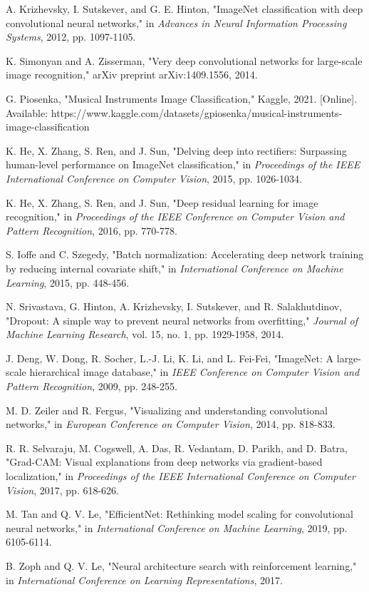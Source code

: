 \begin{thebibliography}{00}
 A. Krizhevsky, I. Sutskever, and G. E. Hinton, "ImageNet classification with deep convolutional neural networks," in \textit{Advances in Neural Information Processing Systems}, 2012, pp. 1097-1105.

 K. Simonyan and A. Zisserman, "Very deep convolutional networks for large-scale image recognition," arXiv preprint arXiv:1409.1556, 2014.

 G. Piosenka, "Musical Instruments Image Classification," Kaggle, 2021. [Online]. Available: https://www.kaggle.com/datasets/gpiosenka/musical-instruments-image-classification

 K. He, X. Zhang, S. Ren, and J. Sun, "Delving deep into rectifiers: Surpassing human-level performance on ImageNet classification," in \textit{Proceedings of the IEEE International Conference on Computer Vision}, 2015, pp. 1026-1034.

 K. He, X. Zhang, S. Ren, and J. Sun, "Deep residual learning for image recognition," in \textit{Proceedings of the IEEE Conference on Computer Vision and Pattern Recognition}, 2016, pp. 770-778.

 S. Ioffe and C. Szegedy, "Batch normalization: Accelerating deep network training by reducing internal covariate shift," in \textit{International Conference on Machine Learning}, 2015, pp. 448-456.

 N. Srivastava, G. Hinton, A. Krizhevsky, I. Sutskever, and R. Salakhutdinov, "Dropout: A simple way to prevent neural networks from overfitting," \textit{Journal of Machine Learning Research}, vol. 15, no. 1, pp. 1929-1958, 2014.

 J. Deng, W. Dong, R. Socher, L.-J. Li, K. Li, and L. Fei-Fei, "ImageNet: A large-scale hierarchical image database," in \textit{IEEE Conference on Computer Vision and Pattern Recognition}, 2009, pp. 248-255.

 M. D. Zeiler and R. Fergus, "Visualizing and understanding convolutional networks," in \textit{European Conference on Computer Vision}, 2014, pp. 818-833.

 R. R. Selvaraju, M. Cogswell, A. Das, R. Vedantam, D. Parikh, and D. Batra, "Grad-CAM: Visual explanations from deep networks via gradient-based localization," in \textit{Proceedings of the IEEE International Conference on Computer Vision}, 2017, pp. 618-626.

 M. Tan and Q. V. Le, "EfficientNet: Rethinking model scaling for convolutional neural networks," in \textit{International Conference on Machine Learning}, 2019, pp. 6105-6114.

 B. Zoph and Q. V. Le, "Neural architecture search with reinforcement learning," in \textit{International Conference on Learning Representations}, 2017.
\end{thebibliography}
